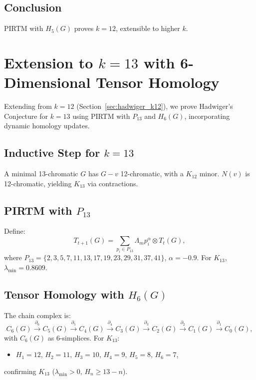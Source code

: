 \documentclass{article}
\theoremstyle{plain}
\begin{document}
\subsection{Conclusion}
PIRTM with \( H_5(G) \) proves \( k = 12 \), extensible to higher \( k \).

\section{Extension to \( k = 13 \) with 6-Dimensional Tensor Homology}
\label{sec:hadwiger_k13}

Extending from \( k = 12 \) (Section~\ref{sec:hadwiger_k12}), we prove Hadwiger’s Conjecture for \( k = 13 \) using PIRTM with \( P_{13} \) and \( H_6(G) \), incorporating dynamic homology updates.

\subsection{Inductive Step for \( k = 13 \)}
A minimal 13-chromatic \( G \) has \( G - v \) 12-chromatic, with a \( K_{12} \) minor. \( N(v) \) is 12-chromatic, yielding \( K_{13} \) via contractions.

\subsection{PIRTM with \( P_{13} \)}
Define:
\begin{equation}
T_{t+1}(G) = \sum_{p_i \in P_{13}} \Lambda_m p_i^\alpha \otimes T_t(G),
\end{equation}
where \( P_{13} = \{2, 3, 5, 7, 11, 13, 17, 19, 23, 29, 31, 37, 41\} \), \( \alpha = -0.9 \). For \( K_{13} \), \( \lambda_{\text{min}} = 0.8609 \).

\subsection{Tensor Homology with \( H_6(G) \)}
The chain complex is:
\begin{equation}
C_6(G) \xrightarrow{\partial_6} C_5(G) \xrightarrow{\partial_5} C_4(G) \xrightarrow{\partial_4} C_3(G) \xrightarrow{\partial_3} C_2(G) \xrightarrow{\partial_2} C_1(G) \xrightarrow{\partial_1} C_0(G),
\end{equation}
with \( C_6(G) \) as 6-simplices. For \( K_{13} \):
\begin{itemize}
    \item \( H_1 = 12 \), \( H_2 = 11 \), \( H_3 = 10 \), \( H_4 = 9 \), \( H_5 = 8 \), \( H_6 = 7 \),
\end{itemize}
confirming \( K_{13} \) (\( \lambda_{\text{min}} > 0 \), \( H_n \geq 13 - n \)).
\end{document}
